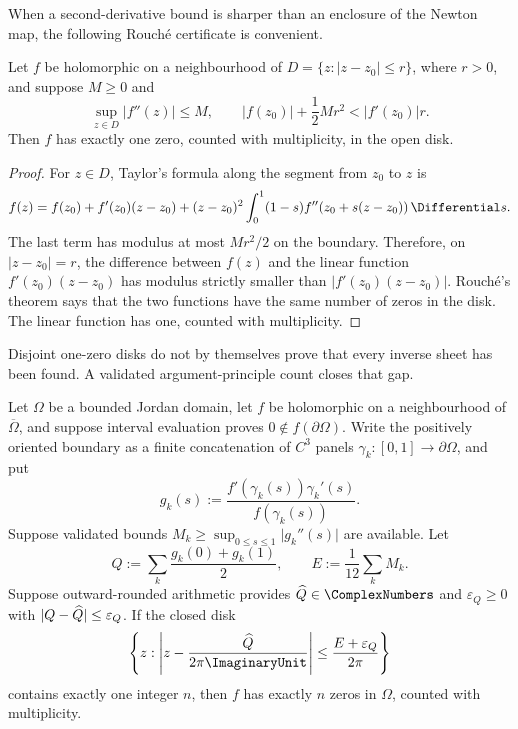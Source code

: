 When a second-derivative bound is sharper than an enclosure of the Newton map,
the following Rouch\'e certificate is convenient.

\begin{theorem}
\label{thm:rouche-one-zero-disk}
Let \(f\) be holomorphic on a neighbourhood of
\(D=\{z:\lvert z-z_0\rvert\le r\}\), where \(r>0\), and suppose \(M\ge0\)
and
\[
 \sup_{z\in D}\lvert f''(z)\rvert\le M,
 \qquad
 \lvert f(z_0)\rvert+\frac12Mr^2<\lvert f'(z_0)\rvert r.
\]
Then \(f\) has exactly one zero, counted with multiplicity, in the open disk.
\end{theorem}

\begin{proof}
For \(z\in D\), Taylor's formula along the segment from \(z_0\) to \(z\) is
\[
 f(z)=f(z_0)+f'(z_0)(z-z_0)
 +(z-z_0)^2\int_0^1(1-s)f''(z_0+s(z-z_0))\,\Differential s.
\]
The last term has modulus at most \(Mr^2/2\) on the boundary.  Therefore, on
\(\lvert z-z_0\rvert=r\), the difference between \(f(z)\) and the linear
function \(f'(z_0)(z-z_0)\) has modulus strictly smaller than
\(\lvert f'(z_0)(z-z_0)\rvert\).  Rouch\'e's theorem says that the two
functions have the same number of zeros in the disk.  The linear function has
one, counted with multiplicity.
\end{proof}

Disjoint one-zero disks do not by themselves prove that every inverse sheet
has been found.  A validated argument-principle count closes that gap.

\begin{theorem}
\label{thm:validated-argument-principle}
Let \(\Omega\) be a bounded Jordan domain, let \(f\) be holomorphic on a
neighbourhood of \(\overline\Omega\), and suppose interval evaluation proves
\(0\notin f(\partial\Omega)\).  Write the positively oriented boundary as a
finite concatenation of \(C^3\) panels
\(\gamma_k:[0,1]\to\partial\Omega\), and put
\[
 g_k(s):=\frac{f'(\gamma_k(s))\gamma_k'(s)}{f(\gamma_k(s))}.
\]
Suppose validated bounds
\(M_k\ge\sup_{0\le s\le1}\lvert g_k''(s)\rvert\) are available.  Let
\[
 Q:=\sum_k\frac{g_k(0)+g_k(1)}2,
 \qquad
 E:=\frac1{12}\sum_kM_k.
\]
Suppose outward-rounded arithmetic provides
\(\CertifiedEnclosureCenter{Q}\in\ComplexNumbers\) and \(\varepsilon_Q\ge0\) with
\(\lvert Q-\widehat{Q}\rvert\le\varepsilon_Q\).  If the closed disk
\[
\left\{z:\left\lvert z-\frac{\CertifiedEnclosureCenter{Q}}{2\pi\ImaginaryUnit}\right\rvert
       \le\frac{E+\varepsilon_Q}{2\pi}\right\}
\]
contains exactly one integer \(n\), then \(f\) has exactly \(n\) zeros in
\(\Omega\), counted with multiplicity.
\end{theorem}

